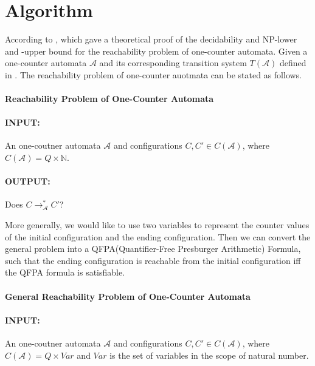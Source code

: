 \documentclass[12pt]{article}
\begin{document}
\section{Algorithm}














According to \cite{DBLP:conf/icalp/ChistikovH17}, which gave a theoretical proof of the decidability and NP-lower and -upper bound for the reachability problem of one-counter automata. Given a one-counter automata $\mathcal{A}$ and its corresponding transition system $T(\mathcal{A})$ defined in \cite{DBLP:conf/icalp/ChistikovH17}. The reachability problem of one-counter auotmata can be stated as follows.

\paragraph{Reachability Problem of One-Counter Automata}

\paragraph{INPUT:} An one-coutner automata $\mathcal{A}$ and configurations $C, C'\in C(\mathcal{A})$, where $C(\mathcal{A}) = Q \times \mathbb{N}$.
\paragraph{OUTPUT:} Does $C \rightarrow^*_\mathcal{A} C'$?


More generally, we would like to use two variables to represent the counter values of the initial configuration and the ending configuration. Then we can convert the general problem into a QFPA(Quantifier-Free Presburger Arithmetic) Formula, such that the ending configuration is reachable from the initial configuration iff the QFPA formula is satisfiable.

\paragraph{General Reachability Problem of One-Counter Automata}

\paragraph{INPUT:} An one-coutner automata $\mathcal{A}$ and configurations $C, C'\in C(\mathcal{A})$, where $C(\mathcal{A}) = Q \times Var$ and $Var$ is the set of variables in the scope of natural number.
\end{document}
